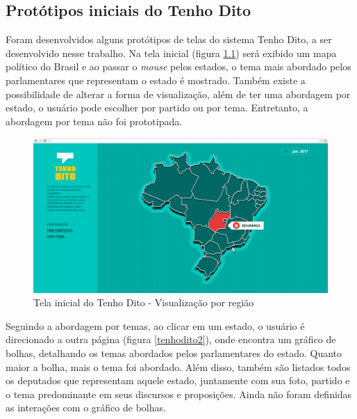 \begin{apendicesenv}

\partapendices


\printindex[urls]

\chapter{Protótipos iniciais do Tenho Dito}
\label{prototipos-apendice}

Foram desenvolvidos alguns protótipos de telas do sistema Tenho Dito, a ser desenvolvido nesse trabalho. Na tela inicial (figura \ref{tenhodito1}) será exibido um mapa político do Brasil e ao passar o \textit{mouse} pelos estados, o tema mais abordado pelos parlamentares que representam o estado é mostrado. Também existe a possibilidade de alterar a forma de visualização, além de ter uma abordagem por estado, o usuário pode escolher por partido ou por tema. Entretanto, a abordagem por tema não foi prototipada.

\begin{figure}[h]
  \centering
  \includegraphics[scale=0.2]{figuras/tenhodito1.eps}
  \caption{Tela inicial do Tenho Dito - Visualização por região}
  \label{tenhodito1}
\end{figure}

Seguindo a abordagem por temas, ao clicar em um estado, o usuário é direcionado a outra página (figura \ref{tenhodito2}), onde encontra um gráfico de bolhas, detalhando os temas abordados pelos parlamentares do estado. Quanto maior a bolha, mais o tema foi abordado. Além disso, também são listados todos os deputados que representam aquele estado, juntamente com sua foto, partido e o tema predominante em seus discursos e proposições. Ainda não foram definidas as interações com o gráfico de bolhas.


\end{apendicesenv}
